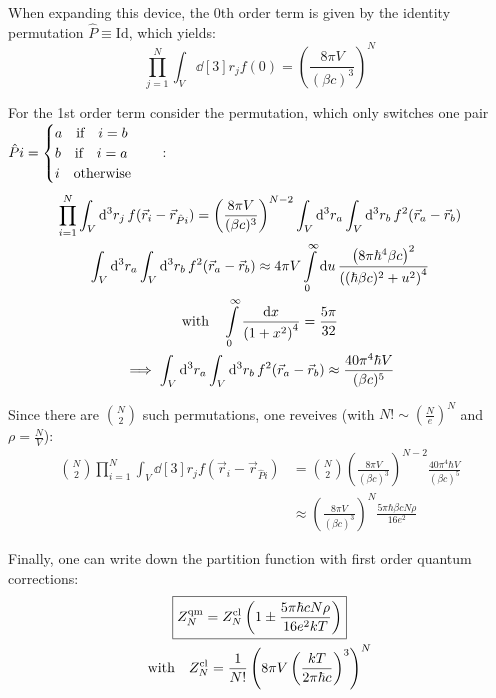 \documentclass[11pt,a4paper]{scrartcl}
\begin{document}
When expanding this device, the 0th order term is given by the identity
permutation $\hat{P}\equiv\mathrm{Id}$, which yields:
\begin{equation*}
    \prod_{j=1}^{N}\int_{V}\dd[3]{r_j}f(0)=\left(\frac{8\pi V}{(\beta
    c)^3}\right)^N
\end{equation*}

For the 1st order term consider the permutation, which only switches one pair
$\hat{P}i=
\begin{cases}
    a\qif i=b\\
    b\qif i=a\\
    i\qotherwise
\end{cases}
$:
\begin{gather*}
    \prod_{i=1}^{N}\int_{V}\dd[3]{r_j}f(\vec{r}_{i}-\vec{r}_{\hat{P}i})
    =\left(\frac{8\pi V}{(\beta
    c)^3}\right)^{N-2}\int_{V}\dd[3]{r_a}\int_{V}\dd[3]{r_b}f^2(\vec{r}_a-\vec{r}_b)
    \\
    \int_{V}\dd[3]{r_a}\int_{V}\dd[3]{r_b}f^2(\vec{r}_a-\vec{r}_b)\approx
    4\pi V\int\limits_{0}^{\infty}\dd{u}
    \frac{\left(8\pi\hbar^4\beta c\right)^2}{\left((\hbar\beta
    c)^2+u^2\right)^4} \\
    \qq*{with}
    \int\limits_{0}^{\infty}\frac{\dd{x}}{\left(1+x^2\right)^4}=\frac{5\pi}{32}\\
    \implies
    \int_{V}\dd[3]{r_a}\int_{V}\dd[3]{r_b}f^2(\vec{r}_a-\vec{r}_b)\approx
    \frac{40\pi^4\hbar V}{(\beta c)^5}
\end{gather*}

Since there are $\binom{N}{2}$ such permutations, one reveives (with
$N!\sim\left(\frac{N}{e}\right)^N$ and $\rho=\frac{N}{V}$):
\begin{align*}
    \binom{N}{2}\prod_{i=1}^{N}\int_{V}\dd[3]{r_j}f(\vec{r}_{i}-\vec{r}_{\hat{P}i})
    &=\binom{N}{2}\left(\frac{8\pi V}{(\beta
    c)^3}\right)^{N-2}\frac{40\pi^4\hbar V}{(\beta c)^5} \\
    &\approx\left(\frac{8\pi V}{(\beta c)^3}\right)^{N}\frac{5\pi\hbar\beta c
    N\rho}{16 e^2}
\end{align*}

Finally, one can write down the partition function with first order quantum
corrections:
\begin{gather*}
    \boxed{%
        Z_{N}^{\mathrm{qm}} = Z_{N}^{\mathrm{cl}}\left(1\pm\frac{5\pi\hbar c N\rho}{16e^2kT}\right)
    }\\
    \qq*{with} Z_{N}^{\mathrm{cl}}=\frac{1}{N!}\left(8\pi V\left(\frac{kT}{2\pi\hbar
    c}\right)^3\right)^N
\end{gather*}
\end{document}
